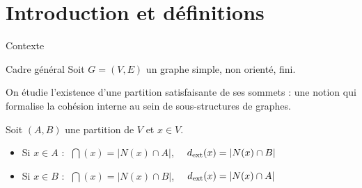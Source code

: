 \section{Introduction et d\'efinitions}

\begin{frame}{Contexte}
  \begin{block}{Cadre g\'en\'eral}
    Soit $G = (V, E)$ un graphe simple, non orient\'e, fini.
    \medskip

    On \'etudie l'existence d'une \alert{partition satisfaisante} de ses sommets : une notion qui formalise la coh\'esion interne au sein de sous-structures de graphes.
  \end{block}

  \bigskip

  \begin{definition}
    Soit $(A,B)$ une partition de $V$ et $x \in V$.
    \begin{itemize}
      \item Si $x \in A$ : $\;\dint(x) = |N(x) \cap A|$, $\quad d_{\mathrm{ext}}(x) = |N(x) \cap B|$
      \item Si $x \in B$ : $\;\dint(x) = |N(x) \cap B|$, $\quad d_{\mathrm{ext}}(x) = |N(x) \cap A|$
    \end{itemize}
  \end{definition}
\end{frame}

